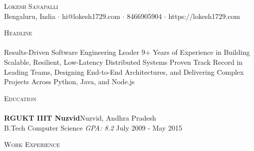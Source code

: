 \documentclass[a4paper]{article}
\newcommand{\lineunder} {
    \vspace*{-8pt} \\
    \hspace*{-18pt} \hrulefill \\
}
\newcommand{\header} [1] {
    {\hspace*{-18pt}\vspace*{6pt} \textsc{#1}}
    \vspace*{-6pt} \lineunder
}
\begin{document}
\vspace*{-40pt}

    

\vspace*{-10pt}
\begin{center}
	{\Huge \scshape {Lokesh Sanapalli}}\\
	Bengaluru, India $\cdot$ hi@lokesh1729.com $\cdot$ 8466905904 $\cdot$ https://lokesh1729.com\\
\end{center}

\header{Headline}
Results-Driven Software Engineering Leader \textbar{} 9+ Years of Experience in Building Scalable, Resilient, Low-Latency Distributed Systems \textbar{} Proven Track Record in Leading Teams, Designing End-to-End Architectures, and Delivering Complex Projects Across Python, Java, and Node.js\\
\vspace*{2mm}

\header{Education}
\textbf{RGUKT IIIT Nuzvid}\hfill Nuzvid, Andhra Pradesh\\
B.Tech Computer Science \textit{GPA: 8.2} \hfill July 2009 - May 2015\\
\vspace{2mm}

\header{Work Experience}
\vspace{1mm}
\end{document}
